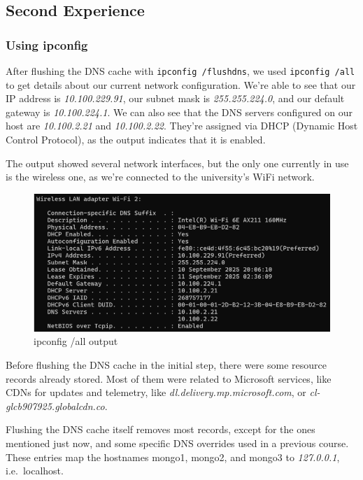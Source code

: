 \subsection{Second Experience}

\subsubsection{Using ipconfig}

After flushing the DNS cache with \texttt{ipconfig /flushdns}, we used
\texttt{ipconfig /all} to get details about our current network configuration.
We're able to see that our IP address is \textit{10.100.229.91}, our subnet
mask is \textit{255.255.224.0}, and our default gateway is
\textit{10.100.224.1}. We can also see that the DNS servers configured on our
host are \textit{10.100.2.21} and \textit{10.100.2.22}. They're assigned via
DHCP (Dynamic Host Control Protocol), as the output indicates that it is
enabled.

The output showed several network interfaces, but the only one currently in use
is the wireless one, as we're connected to the university's WiFi network.

\begin{figure}[htbp]
    \centering
    \includegraphics[width=1\linewidth]{img/9.png}
    \caption{ipconfig /all output}\label{fig:9}
\end{figure}

Before flushing the DNS cache in the initial step, there were some resource
records already stored. Most of them were related to Microsoft services, like
CDNs for updates and telemetry, like \textit{dl.delivery.mp.microsoft.com}, or
\textit{ cl-glcb907925.globalcdn.co}.

Flushing the DNS cache itself removes most records, except for the ones
mentioned just now, and some specific DNS overrides used in a previous course.
These entries map the hostnames mongo1, mongo2, and mongo3 to
\textit{127.0.0.1}, i.e.\ localhost.

